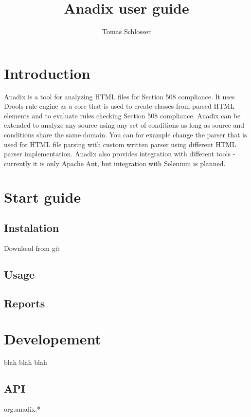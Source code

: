 \documentclass{book}
\title{Anadix user guide}
\author{Tomas Schlosser}
\begin{document}
\maketitle
\tableofcontents

\chapter{Introduction}
Anadix is a tool for analyzing HTML files for Section 508 compliance. It uses
Drools rule engine as a core that is used to create classes from parsed HTML
elements and to evaluate rules checking Section 508 compliance. Anadix can be
extended to analyze any source using any set of conditions as long as source and
conditions share the same domain. You can for example change the parser that is
used for HTML file parsing with custom written parser using different HTML
parser implementation. Anadix also provides integration with different tools -
currently it is only Apache Ant, but integration with Selenium is planned.

\chapter{Start guide}

\section{Instalation}
Download from git

\section{Usage}

\section{Reports}

\chapter{Developement}
blah blah blah
\section{API}
org.anadix.*
\end{document}
